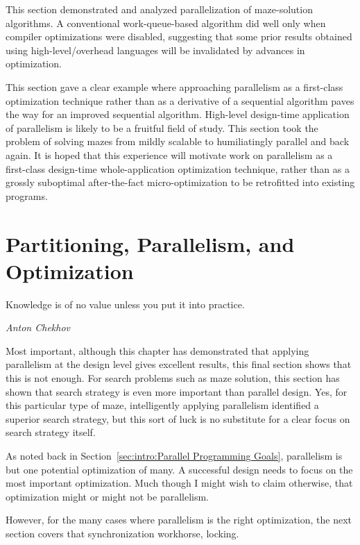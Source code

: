 This section demonstrated and analyzed parallelization of maze-solution
algorithms.
A conventional work-queue-based algorithm did well only when compiler
optimizations were disabled, suggesting that some prior results obtained
using high-level/overhead languages will be invalidated
by advances in optimization.

This section gave a clear example where approaching parallelism
as a first-class optimization technique rather than as a derivative of a
sequential algorithm paves the way for an improved sequential algorithm.
High-level design-time application of parallelism is likely to be a
fruitful field of study.
This section took the problem of solving mazes from mildly scalable
to humiliatingly parallel and back again.
It is hoped that this experience will motivate work on parallelism
as a first-class design-time whole-application optimization technique,
rather than as a grossly suboptimal after-the-fact micro-optimization
to be retrofitted into existing programs.

\section{Partitioning, Parallelism, and Optimization}
\label{sec:SMPdesign:Partitioning, Parallelism, and Optimization}
%
\epigraph{Knowledge is of no value unless you put it into practice.}
	 {\emph{Anton Chekhov}}

Most important, although this chapter has demonstrated that applying
parallelism at the design level gives excellent results, this final
section shows that this is not enough.
For search problems such as maze solution, this section has shown that
search strategy is even more important than parallel design.
Yes, for this particular type of maze, intelligently applying parallelism
identified a superior search strategy, but this sort of luck is no
substitute for a clear focus on search strategy itself.

As noted back in Section~\ref{sec:intro:Parallel Programming Goals},
parallelism is but one potential optimization of many.
A successful design needs to focus on the most important optimization.
Much though I might wish to claim otherwise, that optimization might
or might not be parallelism.

However, for the many cases where parallelism is the right optimization,
the next section covers that synchronization workhorse, locking.
